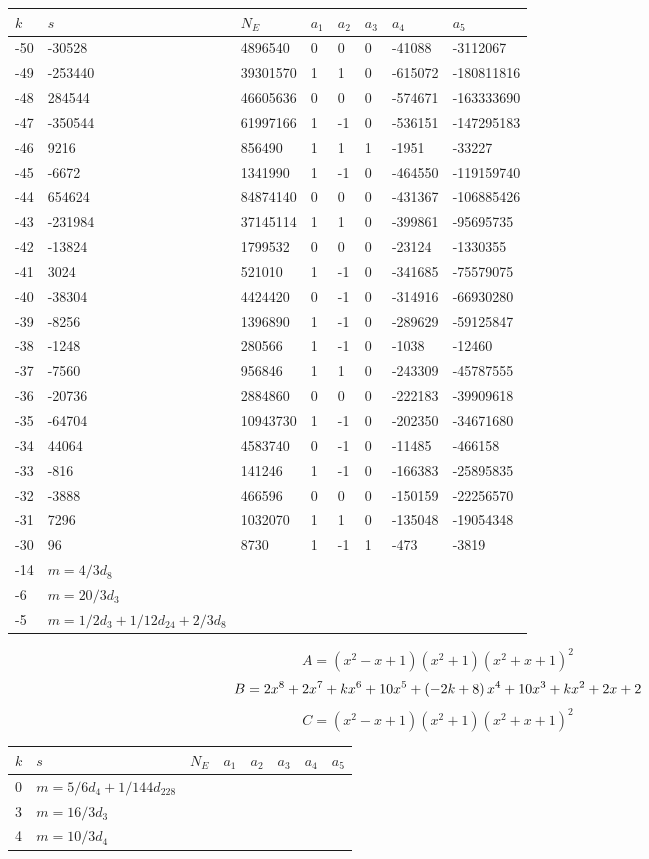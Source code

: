 \documentclass{amsart}
\begin{document}
\begin{longtable}{|l|l|l|lllll|}
\hline
$k$ & $s$ & $N_E$ & $a_1$ & $a_2$ & $a_3$ & $a_4$ & $a_5$\\
\hline
-50&-30528&4896540&0&0&0&-41088&-3112067\\
-49&-253440&39301570&1&1&0&-615072&-180811816\\
-48&284544&46605636&0&0&0&-574671&-163333690\\
-47&-350544&61997166&1&-1&0&-536151&-147295183\\
-46&9216&856490&1&1&1&-1951&-33227\\
-45&-6672&1341990&1&-1&0&-464550&-119159740\\
-44&654624&84874140&0&0&0&-431367&-106885426\\
-43&-231984&37145114&1&1&0&-399861&-95695735\\
-42&-13824&1799532&0&0&0&-23124&-1330355\\
-41&3024&521010&1&-1&0&-341685&-75579075\\
-40&-38304&4424420&0&-1&0&-314916&-66930280\\
-39&-8256&1396890&1&-1&0&-289629&-59125847\\
-38&-1248&280566&1&-1&0&-1038&-12460\\
-37&-7560&956846&1&1&0&-243309&-45787555\\
-36&-20736&2884860&0&0&0&-222183&-39909618\\
-35&-64704&10943730&1&-1&0&-202350&-34671680\\
-34&44064&4583740&0&-1&0&-11485&-466158\\
-33&-816&141246&1&-1&0&-166383&-25895835\\
-32&-3888&466596&0&0&0&-150159&-22256570\\
-31&7296&1032070&1&1&0&-135048&-19054348\\
-30&96&8730&1&-1&1&-473&-3819\\
-14&$m=4/3d_{8}$&&\multicolumn{5}{c|}{}\\
-6&$m=20/3d_{3}$&&\multicolumn{5}{c|}{}\\
-5&$m=1/2d_{3}+1/12d_{24}+2/3d_{8}$&&\multicolumn{5}{c|}{}\\
\hline
\end{longtable}
$$A=(x^2
 - x
 + 1)(x^2
 + 1)(x^2
 + x
 + 1)^{2}$$
$$B=2\*x^8
 + 2\*x^7
 + k\*x^6
 + 10\*x^5
 + \left(-2\*k
 + 8\right) \*x^4
 + 10\*x^3
 + k\*x^2
 + 2\*x
 + 2$$
$$C=(x^2
 - x
 + 1)(x^2
 + 1)(x^2
 + x
 + 1)^{2}$$
\begin{longtable}{|l|l|l|lllll|}
\hline
$k$ & $s$ & $N_E$ & $a_1$ & $a_2$ & $a_3$ & $a_4$ & $a_5$\\
\hline
0&$m=5/6d_{4}+1/144d_{228}$&&\multicolumn{5}{c|}{}\\
3&$m=16/3d_{3}$&&\multicolumn{5}{c|}{}\\
4&$m=10/3d_{4}$&&\multicolumn{5}{c|}{}\\
\hline
\end{longtable}
\end{document}
